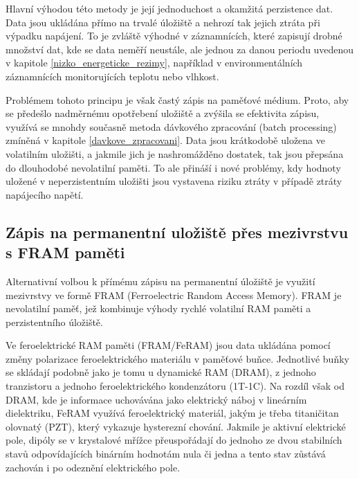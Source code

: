 Hlavní výhodou této metody je její jednoduchost a okamžitá perzistence dat. Data jsou ukládána přímo na trvalé úložiště a nehrozí tak jejich ztráta při výpadku napájení. To je zvláště výhodné v záznamnících, které zapisují drobné množství dat, kde se data neměří neustále, ale jednou za danou periodu uvedenou v kapitole \ref{nizko_energeticke_rezimy}, například v environmentálních záznamnících monitorujících teplotu nebo vlhkost.

Problémem tohoto principu je však častý zápis na paměťové médium. Proto, aby se předešlo nadměrnému opotřebení uložiště a zvýšila se efektivita zápisu, využívá se mnohdy současně metoda dávkového zpracování (batch processing) zmíněná v kapitole \ref{davkove_zpracovani}. Data jsou krátkodobě uložena ve volatilním uložišti, a jakmile jich je nashromážděno dostatek, tak jsou přepsána do dlouhodobé nevolatilní paměti. To ale přináší i nové problémy, kdy hodnoty uložené v neperzistentním uložišti jsou vystavena riziku ztráty v případě ztráty napájecího napětí.

\subsection{Zápis na permanentní uložiště přes mezivrstvu s FRAM paměti}
Alternativní volbou k přímému zápisu na permanentní úložiště je využití mezivrstvy ve formě FRAM (Ferroelectric Random Access Memory). FRAM je nevolatilní paměť, jež kombinuje výhody rychlé volatilní RAM paměti a perzistentního úložiště.

Ve feroelektrické RAM paměti (FRAM/FeRAM) jsou data ukládána pomocí změny polarizace feroelektrického materiálu v paměťové buňce. Jednotlivé buňky se skládají podobně jako je tomu u dynamické RAM (DRAM), z jednoho tranzistoru a jednoho feroelektrického kondenzátoru (1T-1C). Na rozdíl však od DRAM, kde je informace uchovávána jako elektrický náboj v lineárním dielektriku, FeRAM využívá feroelektrický materiál, jakým je třeba titaničitan olovnatý (PZT), který vykazuje hysterezní chování. Jakmile je aktivní elektrické pole, dipóly se v krystalové mřížce přeuspořádají do jednoho ze dvou stabilních stavů odpovídajících binárním hodnotám nula či jedna a tento stav zůstává zachován i po odeznění elektrického pole. \cite{ieee_feram_ultra_high_density_embedded_mem}

